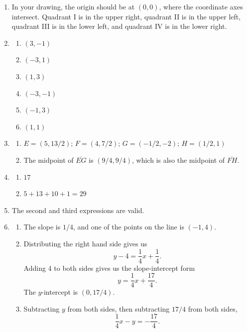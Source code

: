 \begin{enumerate}
\item In your drawing, the origin should be at $(0,0)$, where the coordinate axes intersect. Quadrant I is in the upper right, quadrant II is in the upper left, quadrant III is in the lower left, and quadrant IV is in the lower right.
\item \begin{enumerate}
\item $(3,-1)$
\item $(-3,1)$
\item $(1,3)$
\item $(-3,-1)$
\item $(-1,3)$
\item $(1,1)$
\end{enumerate}
\item \begin{enumerate}
\item $E = (5, 13/2)$; $F = (4, 7/2)$; $G = (-1/2, -2)$; $H = (1/2,1)$
\item The midpoint of $\overline{EG}$ is $(9/4, 9/4)$, which is also the midpoint of $\overline{FH}$.
\end{enumerate}
\item \begin{enumerate}
\item $\boxed{17}$
\item $5 + 13 + 10 + 1 = \boxed{29}$
\end{enumerate}
\item The second and third expressions are valid.
\item \begin{enumerate}
\item The slope is $\boxed{1/4}$, and one of the points on the line is $\boxed{(-1,4)}$.
\item Distributing the right hand side gives us 
\begin{equation*}
y - 4 = \frac{1}{4}x + \frac{1}{4}.
\end{equation*}
Adding 4 to both sides gives us the slope-intercept form
\begin{equation*}
\boxed{y = \frac{1}{4}x + \frac{17}{4}}.
\end{equation*}
The $y$-intercept is $\boxed{(0, 17/4)}$.
\item Subtracting $y$ from both sides, then subtracting $17/4$ from both sides,
\begin{equation*}
\frac{1}{4}x - y = -\frac{17}{4}.
\end{equation*}

\end{enumerate}
\end{enumerate}
